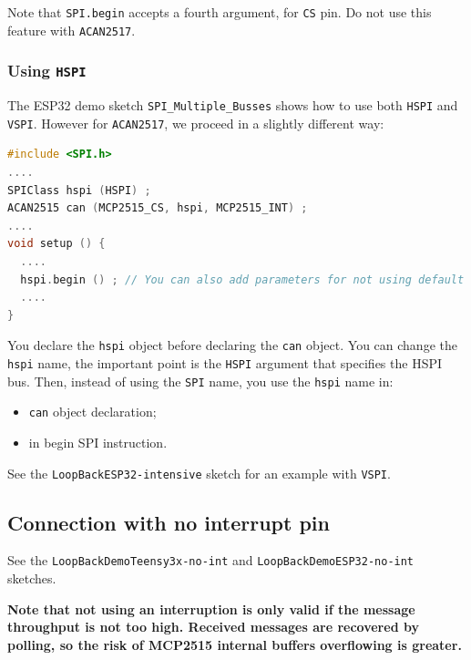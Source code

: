 \documentclass[9pt, a4paper, obeyspaces]{extarticle}
\newcommand \subsectionLabel[2]{\subsection{#1}\label{subsec:#2}}
\begin{document}
Note that \texttt{SPI.begin} accepts a fourth argument, for \texttt{CS} pin. Do not use this feature with \texttt{ACAN2517}.

\subsubsection{Using \texttt{HSPI}}

The ESP32 demo sketch \texttt{SPI\_Multiple\_Busses} shows how to use both \texttt{HSPI} and  \texttt{VSPI}. However for \texttt{ACAN2517}, we proceed in a slightly different way:
{ \small\begin{lstlisting}[language=c++]
#include <SPI.h>
....
SPIClass hspi (HSPI) ;
ACAN2515 can (MCP2515_CS, hspi, MCP2515_INT) ;
....
void setup () {
  ....
  hspi.begin () ; // You can also add parameters for not using default pins
  ....
}
\end{lstlisting}}

You declare the \texttt{hspi} object before declaring the \texttt{can} object. You can change the \texttt{hspi} name, the important point is the \texttt{HSPI} argument that specifies the HSPI bus. Then, instead of using the \texttt{SPI} name, you use the \texttt{hspi} name in:
\begin{itemize}
  \item \texttt{can} object declaration;
  \item in begin SPI instruction.
\end{itemize}

See the \texttt{LoopBackESP32-intensive} sketch for an example with \texttt{VSPI}.




\subsectionLabel{Connection with no interrupt pin}{noInterruptPin}

See the \texttt{LoopBackDemoTeensy3x-no-int} and \texttt{LoopBackDemoESP32-no-int} sketches.

{\bf Note that not using an interruption is only valid if the message throughput is not too high. Received messages are recovered by polling, so the risk of MCP2515 internal buffers overflowing is greater.}
\end{document}
